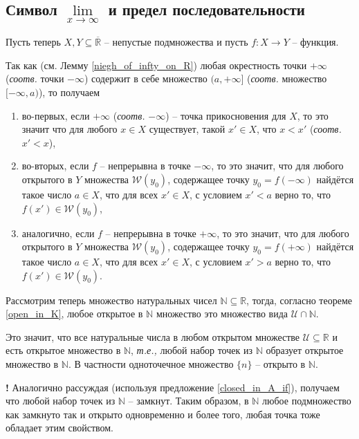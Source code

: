 \subsection{Символ $\lim\limits_{x \to \infty}$ и предел последовательности}

Пусть теперь $X,Y \subseteq \overline{\mathbb{R}}$ -- непустые подмножества и пусть $f: X \to Y$ -- функция. 

\begin{remark}\label{about_infty}
Так как (см. Лемму \ref{niegh_of_infty_on_R}) любая окрестность точки $+\infty$ (\textit{соотв.} точки $-\infty$) содержит в себе множество $(a,+\infty]$ (\textit{соотв.} множество $[-\infty, a)$), то получаем
\begin{enumerate}
    \item[] во-первых, если $+\infty$ (\textit{соотв.} $-\infty$) -- точка прикосновения для $X$, то это значит что для любого $x \in X$ существует, такой $x' \in X$, что $x<x'$ (\textit{соотв.} $x'<x$),
    \item[] во-вторых, если $f$ -- непрерывна в точке $-\infty$, то это значит, что для любого открытого в $Y$ множества $\mathscr{W}(y_0)$, содержащее точку $y_0 = f(-\infty)$ найдётся такое число $a \in X$, что для всех $x'\in X$, с условием $x'< a$ верно то, что $f(x') \in \mathscr{W}(y_0)$,
    \item[] аналогично, если $f$ -- непрерывна в точке $+\infty$, то это значит, что для любого открытого в $Y$ множества $\mathscr{W}(y_0)$, содержащее точку $y_0 = f(+\infty)$ найдётся такое число $a \in X$, что для всех $x'\in X$, с условием $x'>a$ верно то, что $f(x') \in \mathscr{W}(y_0)$.
\end{enumerate}    
\end{remark}


Рассмотрим теперь множество натуральных чисел $\mathbb{N} \subseteq \mathbb{R}$, тогда, согласно теореме \ref{open_in_K}, любое открытое в $\mathbb{N}$ множество это множество вида $\mathscr{U} \cap \mathbb{N}$.

Это значит, что все натуральные числа в любом открытом множестве $\mathscr{U} \subseteq \mathbb{R}$ и есть открытое множество в $\mathbb{N}$, \textit{т.е.,} любой набор точек из $\mathbb{N}$ образует открытое множество в $\mathbb{N}$. В частности одноточечное множество $\{n\}$ -- открыто в $\mathbb{N}.$

\begin{mydangerr}{\bf !}
    Аналогично рассуждая (используя предложение \ref{closed_in_A_if}), получаем что любой набор точек из $\mathbb{N}$ -- замкнут. Таким образом, в $\mathbb{N}$ любое подмножество как замкнуто так и открыто одновременно и более того, любая точка тоже обладает этим свойством. 
\end{mydangerr}

